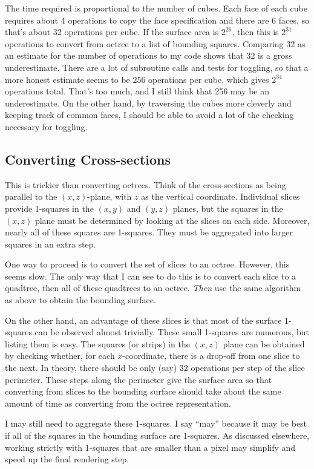 \documentclass[titlepage,oneside,10pt]{article}
\begin{document}
The time required is proportional to the number of cubes. Each face of
each cube requires about 4 operations to copy the face specification
and there are 6 faces, so that's about 32 operations per cube. If the
surface area is $2^{26}$, then this is $2^{31}$ operations to convert
from octree to a list of bounding squares. Comparing 32 as an estimate
for the number of operations to my code shows that 32 is a gross
underestimate. There are a lot of subroutine calls and tests for
toggling, so that a more honest estimate seems to be 256 operations
per cube, which gives $2^{34}$ operations total. That's 
too much, and I still think that 256 may be an underestimate. On the
other hand, by traversing the cubes more cleverly and keeping track of
common faces, I should be able to avoid a lot of the checking
necessary for toggling. 

\subsection{Converting Cross-sections}

This is trickier than converting octrees. Think of the cross-sections
as being parallel to the $(x,z)$-plane, with $z$ as the vertical
coordinate. Individual slices provide 1-squares in the $(x,y)$ and
$(y,z)$ planes, but the squares in the $(x,z)$ plane must be determined
by looking at the slices on each side. Moreover, nearly all of these
squares are 1-squares. They must be aggregated into larger squares in
an extra step.

One way to proceed is to convert the set of slices to an
octree. However, this seems slow. The only way that I can see to do
this is to convert each slice to a quadtree, then all of these
quadtrees to an octree. \emph{Then} use the same algorithm as above to
obtain the bounding surface. 

On the other hand, an advantage of these slices is that most of the
surface 1-squares can be observed almost trivially. These small
1-squares are numerous, but listing them is easy. The squares (or strips) in
the $(x,z)$ plane can be obtained by checking whether, for each
$x$-coordinate,  there is a drop-off from one slice to the next. In
theory, there should be only (say) 32 operations per step of the slice
perimeter. These steps along the perimeter give the surface area so
that converting from slices to the bounding surface should take about
the same amount of time as converting from the octree representation.

I may still need to aggregate these 1-squares. I say ``may'' because
it may be best if all of the squares in the bounding surface are
1-squares. As discussed elsewhere, working strictly with 1-squares
that are smaller than a pixel may simplify and speed up the final
rendering step.
\end{document}
